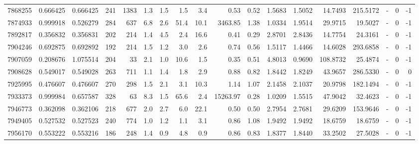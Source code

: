 \begin{tabular}{rrrrrrrrrrrrrrrlrr}
   7868255 & 0.666425 &   0.666425 &  241 & 1383 &      1.3 &      1.5 &     1.5 &      3.4 &       0.53 &        0.52 &  1.5683 &  1.5052 &   14.7493 &  215.5172 &             - &        0 &         -1 \\
   7874933 & 0.999918 &   0.526279 &  284 &  637 &      6.8 &      2.6 &    51.4 &     10.1 &    3463.85 &        1.38 &  1.0334 &  1.9514 &   29.9715 &   19.5027 &             - &        0 &         -1 \\
   7892817 & 0.356832 &   0.356831 &  202 &  214 &      1.4 &      4.5 &     2.4 &     16.6 &       0.41 &        0.29 &  2.8701 &  2.8436 &   14.7754 &   24.3161 &             - &        0 &         -1 \\
   7904246 & 0.692875 &   0.692892 &  192 &  214 &      1.5 &      1.2 &     3.0 &      2.6 &       0.74 &        0.56 &  1.5117 &  1.4466 &   14.6028 &  293.6858 &             - &        0 &         -1 \\
   7907059 & 0.208676 &   1.075514 &  204 &   33 &      2.1 &      1.0 &    10.6 &      1.5 &       0.35 &        0.51 &  4.8013 &  0.9690 &  108.8732 &   25.4874 &             - &        0 &         -1 \\
   7908628 & 0.549017 &   0.549028 &  263 &  711 &      1.1 &      1.4 &     1.8 &      2.9 &       0.88 &        0.82 &  1.8442 &  1.8249 &   43.9657 &  286.5330 &             - &        0 &          0 \\
   7925995 & 0.476607 &   0.476607 &  270 &  298 &      1.5 &      2.1 &     3.1 &     10.3 &       1.14 &        1.07 &  2.1458 &  2.1037 &   20.9798 &  182.1494 &             - &        0 &         -1 \\
   7933373 & 0.999984 &   0.657587 &  328 &   63 &      8.3 &      1.5 &    65.6 &      2.4 &   15263.97 &        0.28 &  1.0209 &  1.5515 &   47.9042 &   32.4623 &             - &        0 &         -1 \\
   7946773 & 0.362098 &   0.362106 &  218 &  677 &      2.0 &      2.7 &     6.0 &     22.1 &       0.50 &        0.50 &  2.7954 &  2.7681 &   29.6209 &  153.9646 &             - &        0 &         -1 \\
   7949405 & 0.527532 &   0.527523 &  240 &  774 &      1.0 &      1.2 &     1.1 &      3.1 &       0.86 &        1.08 &  1.9492 &  1.9492 &   18.6759 &   18.6759 &             - &        0 &         -1 \\
   7956170 & 0.553222 &   0.553216 &  186 &  248 &      1.4 &      0.9 &     4.8 &      0.9 &       0.86 &        0.83 &  1.8377 &  1.8440 &   33.2502 &   27.5028 &             - &        0 &         -1 \\

\end{tabular}
